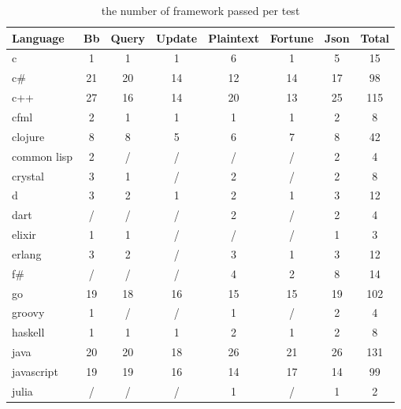 \begin{table*}
    \raggedright
    \caption{the number of framework passed per test }
    \label{table:frameworks_count}
    \begin{tabular}{l|c|c|c|c|c|c|c}
        \toprule
        Language    & Bb  & Query & Update & Plaintext & Fortune & Json & Total \\
        \midrule
        c           & 1   & 1     & 1      & 6         & 1       & 5    & 15    \\
        c\#         & 21  & 20    & 14     & 12        & 14      & 17   & 98    \\
        c++         & 27  & 16    & 14     & 20        & 13      & 25   & 115   \\
        cfml        & 2   & 1     & 1      & 1         & 1       & 2    & 8     \\
        clojure     & 8   & 8     & 5      & 6         & 7       & 8    & 42    \\
        common lisp & 2   & /     & /      & /         & /       & 2    & 4     \\
        crystal     & 3   & 1     & /      & 2         & /       & 2    & 8     \\
        d           & 3   & 2     & 1      & 2         & 1       & 3    & 12    \\
        dart        & /   & /     & /      & 2         & /       & 2    & 4     \\
        elixir      & 1   & 1     & /      & /         & /       & 1    & 3     \\
        erlang      & 3   & 2     & /      & 3         & 1       & 3    & 12    \\
        f\#         & /   & /     & /      & 4         & 2       & 8    & 14    \\
        go          & 19  & 18    & 16     & 15        & 15      & 19   & 102   \\
        groovy      & 1   & /     & /      & 1         & /       & 2    & 4     \\
        haskell     & 1   & 1     & 1      & 2         & 1       & 2    & 8     \\
        java        & 20  & 20    & 18     & 26        & 21      & 26   & 131   \\
        javascript  & 19  & 19    & 16     & 14        & 17      & 14   & 99    \\
        julia       & /   & /     & /      & 1         & /       & 1    & 2     \\

\end{tabular}
\end{table*}
